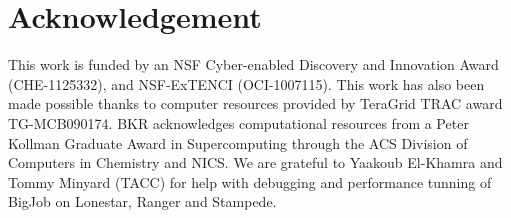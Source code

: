 \documentclass{sig-alternate}
\begin{document}
\section*{Acknowledgement} {\footnotesize This work is funded by an
  NSF Cyber-enabled Discovery and Innovation Award (CHE-1125332), and
  NSF-ExTENCI (OCI-1007115). This work has also been made possible
  thanks to computer resources provided by TeraGrid TRAC award
  TG-MCB090174.  BKR acknowledges computational resources from a 
  Peter Kollman Graduate Award in Supercomputing through the ACS Division of 
  Computers in Chemistry and NICS. We are grateful to Yaakoub
  El-Khamra and Tommy Minyard (TACC) for help with debugging and
  performance tunning of BigJob on Lonestar, Ranger and Stampede.}


%
%

\end{document}
